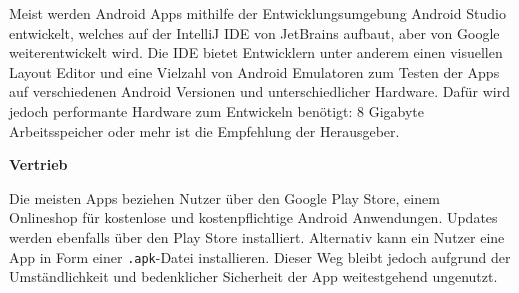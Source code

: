 

Meist werden Android Apps mithilfe der Entwicklungsumgebung Android Studio entwickelt, welches auf der IntelliJ IDE von JetBrains aufbaut, aber von Google weiterentwickelt wird. Die IDE bietet Entwicklern unter anderem einen visuellen Layout Editor und eine Vielzahl von Android Emulatoren zum Testen der Apps auf verschiedenen Android Versionen und unterschiedlicher Hardware. Dafür wird jedoch performante Hardware zum Entwickeln benötigt: 8 Gigabyte Arbeitsspeicher oder mehr ist die Empfehlung der Herausgeber. \cite{AndroidStudio}

\textbf{Vertrieb}

Die meisten Apps beziehen Nutzer über den Google Play Store, einem Onlineshop für kostenlose und kostenpflichtige Android Anwendungen. 
Updates werden ebenfalls über den Play Store installiert. Alternativ kann ein Nutzer eine App in Form einer \texttt{.apk}-Datei installieren. Dieser Weg bleibt jedoch aufgrund der Umständlichkeit und bedenklicher Sicherheit der App weitestgehend ungenutzt.

